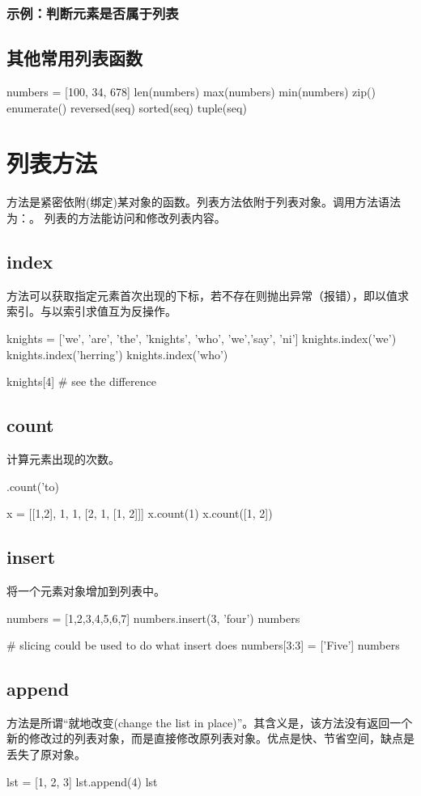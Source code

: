 \subsubsection{示例：判断元素是否属于列表}
\subsection{其他常用列表函数}
\begin{python}
numbers = [100, 34, 678]
len(numbers)
max(numbers)
min(numbers)
zip()
enumerate()
reversed(seq)
sorted(seq)
tuple(seq)
\end{python}
\section{列表方法}
方法是紧密依附(绑定)某对象的函数。列表方法依附于列表对象。调用方法语法为：。 列表的方法能访问和修改列表内容。
\subsection{index}
方法可以获取指定元素首次出现的下标，若不存在则抛出异常（报错），即以值求索引。与以索引求值互为反操作。
\begin{python}
knights = ['we', 'are', 'the', 'knights', 'who', 'we','say', 'ni']
knights.index('we')
knights.index('herring')
knights.index('who')

knights[4] # see the difference
\end{python}
\subsection{count}
计算元素出现的次数。
\begin{python}
['to', 'be', 'or', 'not', 'to', 'be'].count('to)

x = [[1,2], 1, 1, [2, 1, [1, 2]]]
x.count(1)
x.count([1, 2])
\end{python}
\subsection{insert}
将一个元素对象增加到列表中。
\begin{python}
numbers = [1,2,3,4,5,6,7]
numbers.insert(3, 'four')
numbers

# slicing could be used to do what insert does
numbers[3:3] = ['Five']
numbers
\end{python}
\subsection{append}
方法是所谓“就地改变(change the list in place)”。其含义是，该方法没有返回一个新的修改过的列表对象，而是直接修改原列表对象。优点是快、节省空间，缺点是丢失了原对象。
\begin{python}
lst = [1, 2, 3]
lst.append(4)
lst
\end{python}
